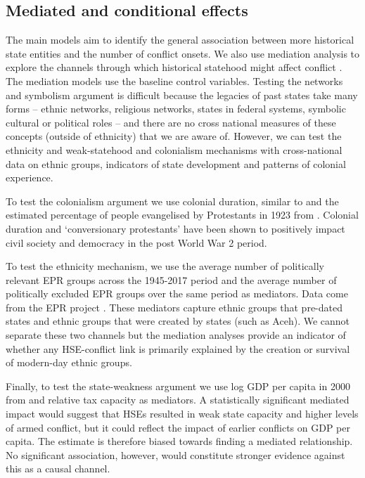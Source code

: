 \subsection{Mediated and conditional effects}

The main models aim to identify the general association between more historical
state entities and the number of conflict onsets. We also use mediation analysis
to explore the channels through which historical statehood might affect conflict
\citep{Imai2011}. The mediation models use the baseline control variables.
Testing the networks and symbolism argument is difficult because the legacies of
past states take many forms -- ethnic networks, religious networks, states in
federal systems, symbolic cultural or political roles -- and there are no cross
national measures of these concepts (outside of ethnicity) that we are aware of.
However, we can test the ethnicity and weak-statehood and colonialism mechanisms
with cross-national data on ethnic groups, indicators of state development and
patterns of colonial experience. 

To test the colonialism argument we use colonial duration, similar to
\citet{Hariri2012} and the estimated percentage of people evangelised by
Protestants in 1923 from \citet{Woodberry2012}. Colonial duration and
`conversionary protestants' have been shown to positively impact civil society
and democracy in the post World War 2 period. 

To test the ethnicity mechanism, we use the average number of politically
relevant EPR groups across the 1945-2017 period and the average number of
politically excluded EPR groups over the same period as mediators. Data come
from the EPR project \citep{Vogt2015}. These mediators capture ethnic groups
that pre-dated states and ethnic groups that were created by states (such as
Aceh). We cannot separate these two channels but the mediation analyses provide
an indicator of whether any HSE-conflict link is primarily explained by the
creation or survival of modern-day ethnic groups. 

Finally, to test the state-weakness argument we use log GDP per capita in 2000
from \citet{Acemoglu2001} and relative tax capacity \citep{Hendrix2010} as
mediators. A statistically significant mediated impact would suggest that HSEs resulted in weak state capacity and higher levels of armed conflict, but it could reflect
the impact of earlier conflicts on GDP per capita. The estimate is therefore
biased towards finding a mediated relationship. No significant association,
however, would constitute stronger evidence against this as a causal channel. 

